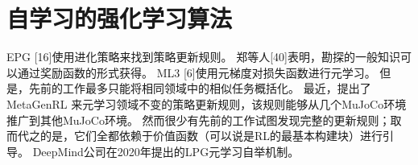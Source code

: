 \section{自学习的强化学习算法}
EPG [16]使用进化策略来找到策略更新规则。
郑等人[40]表明，勘探的一般知识可以通过奖励函数的形式获得。 
ML3 [6]使用元梯度对损失函数进行元学习。
但是，先前的工作最多只能将相同领域中的相似任务概括化。
最近，提出了MetaGenRL \cite{kirschImprovingGeneralizationMeta2019} 来元学习领域不变的策略更新规则，该规则能够从几个MuJoCo环境推广到其他MuJoCo环境。
然而很少有先前的工作试图发现完整的更新规则；取而代之的是，它们全都依赖于价值函数（可以说是RL的最基本构建块）进行引导。
DeepMind公司在2020年提出的LPG元学习自举机制\cite{ohDiscoveringReinforcementLearning2020}。
